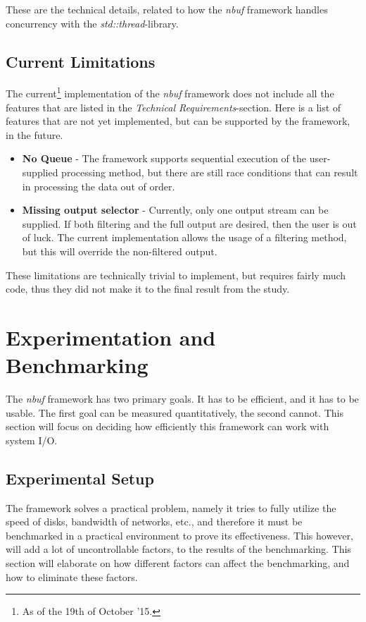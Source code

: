 \documentclass[a4paper]{article}
\newcommand{\nbuf}{\textit{nbuf} }
\begin{document}
These are the technical details, related to how the \nbuf framework handles concurrency with the \textit{std::thread}-library.


\subsection{Current Limitations}
The current\footnote{As of the 19th of October '15.} implementation of the \nbuf framework does not include all the features that are listed in the \textit{Technical Requirements}-section. Here is a list of features that are not yet implemented, but can be supported by the framework, in the future.

\begin{itemize}
\item \textbf{No Queue} - The framework supports sequential execution of the user-supplied processing method, but there are still race conditions that can result in processing the data out of order.
\item \textbf{Missing output selector} - Currently, only one output stream can be supplied. If both filtering and the full output are desired, then the user is out of luck. The current implementation allows the usage of a filtering method, but this will override the non-filtered output. 
\end{itemize}

These limitations are technically trivial to implement, but requires fairly much code, thus they did not make it to the final result from the study.


\newpage
\section{Experimentation and Benchmarking}
The \nbuf framework has two primary goals. It has to be efficient, and it has to be usable. The first goal can be measured quantitatively, the second cannot. This section will focus on deciding how efficiently this framework can work with system I/O. 


\subsection{Experimental Setup}
The framework solves a practical problem, namely it tries to fully utilize the speed of disks, bandwidth of networks, etc., and therefore it must be benchmarked in a practical environment to prove its effectiveness. This however, will add a lot of uncontrollable factors, to the results of the benchmarking. This section will elaborate on how different factors can affect the benchmarking, and how to eliminate these factors.\\
\end{document}
